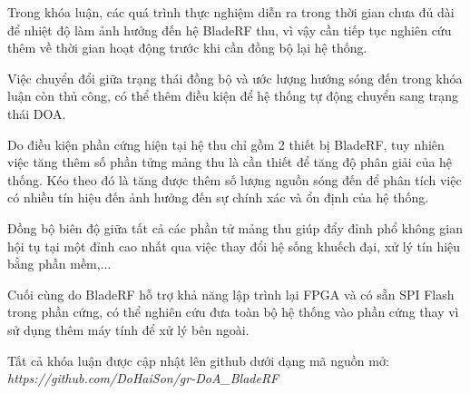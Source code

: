 

Trong khóa luận, các quá trình thực nghiệm diễn ra trong thời gian chưa đủ dài để nhiệt độ làm ảnh hưởng đến hệ BladeRF thu, vì vậy cần tiếp tục nghiên cứu thêm về thời gian hoạt động trước khi cần đồng bộ lại hệ thống.

Việc chuyển đổi giữa trạng thái đồng bộ và ước lượng hướng sóng đến trong khóa luận còn thủ công, có thể thêm điều kiện để hệ thống tự động chuyển sang trạng thái DOA.

Do điều kiện phần cứng hiện tại hệ thu chỉ gồm 2 thiết bị BladeRF, tuy nhiên việc tăng thêm số phần tửng mảng thu là cần thiết để tăng độ phân giải của hệ thống. Kéo theo đó là tăng được thêm số lượng nguồn sóng đến để phân tích việc có nhiều tín hiệu đến ảnh hưởng đến sự chính xác và ổn định của hệ thống.

Đồng bộ biên độ giữa tất cả các phần tử mảng thu giúp đẩy đỉnh phổ không gian hội tụ tại một đỉnh cao nhất qua việc thay đổi hệ sống khuếch đại, xử lý tín hiệu bằng phần mềm,...

Cuối cùng do BladeRF hỗ trợ khả năng lập trình lại FPGA và có sẵn SPI Flash trong phần cứng, có thể nghiên cứu đưa toàn bộ hệ thống vào phần cứng thay vì sử dụng thêm máy tính để xử lý bên ngoài.

Tất cả khóa luận được cập nhật lên github dưới dạng mã nguồn mở: \\
\textit{https://github.com/DoHaiSon/gr-DoA\_BladeRF}